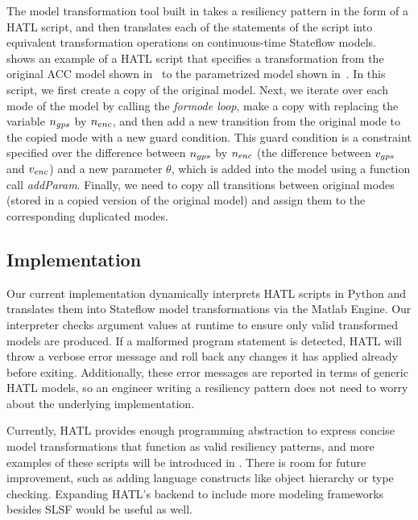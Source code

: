 The model transformation tool built in \toolreaffirm takes a resiliency pattern in the form of a HATL script, and then translates each of the statements of the script into equivalent transformation operations on continuous-time Stateflow models.
%
~ shows an example of a HATL script that specifies a transformation from the original ACC model shown in~ to the parametrized model shown in~. 
In this script, we first create a copy of the original model. Next, we iterate over each mode of the model by calling the \emph{formode loop}, make a copy with replacing the variable $n_{gps}$ by $n_{enc}$, and then add a new transition from the original mode to the copied mode with a new guard condition. This guard condition is a constraint specified over the difference between $n_{gps}$ by $n_{enc}$ (\ie the difference between $v_{gps}$ and $v_{enc}$)  and a new parameter $\theta$, which is added into the model using a function call \emph{addParam}. 
Finally, we need to copy all transitions between original modes (stored in a copied version of the original model) and assign them to the corresponding duplicated modes.

%
\vspace{-0.5em}%
\subsection{Implementation}
%
Our current implementation dynamically interprets HATL scripts in
Python and translates them into Stateflow model transformations via
the Matlab Engine. Our interpreter checks argument values at runtime
to ensure only valid transformed models are produced. If a malformed
program statement is detected, HATL will throw a verbose error message
and roll back any changes it has applied already before
exiting. Additionally, these error messages are reported in terms of
generic HATL models, so an engineer writing a resiliency pattern does
not need to worry about the underlying implementation.

Currently, HATL provides enough programming abstraction to express concise model transformations that function as valid resiliency patterns, and more examples of these scripts will be introduced in . There is room for future improvement, such as adding language constructs like object hierarchy or type checking. Expanding HATL's backend to include more modeling frameworks besides SLSF would be useful as well.










